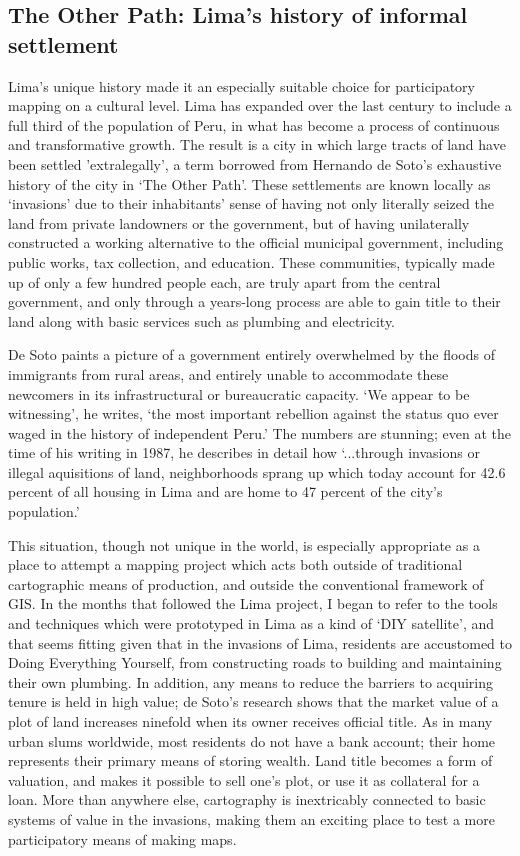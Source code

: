 \documentclass[11pt]{report}
\begin{document}
\subsection{The Other Path: Lima's history of informal settlement}

Lima's unique history made it an especially suitable choice for participatory mapping on a cultural level. Lima has expanded over the last century to include a full third of the population of Peru, in what has become a process of continuous and transformative growth. The result is a city in which large tracts of land have been settled 'extralegally', a term borrowed from Hernando de Soto's exhaustive history of the city in `The Other Path'. These settlements are known locally as `invasions' due to their inhabitants' sense of having not only literally seized the land from private landowners or the government, but of having unilaterally constructed a working alternative to the official municipal government, including public works, tax collection, and education. These communities, typically made up of only a few hundred people each, are truly apart from the central government, and only through a years-long process are able to gain title to their land along with basic services such as plumbing and electricity.

De Soto paints a picture of a government entirely overwhelmed by the floods of immigrants from rural areas, and entirely unable to accommodate these newcomers in its infrastructural or bureaucratic capacity. `We appear to be witnessing', he writes, `the most important rebellion against the status quo ever waged in the history of independent Peru.' The numbers are stunning; even at the time of his writing in 1987, he describes in detail how `...through invasions or illegal aquisitions of land, neighborhoods sprang up which today account for 42.6 percent of all housing in Lima and are home to 47 percent of the city's population.' \cite{desoto1987sendero}

This situation, though not unique in the world, is especially appropriate as a place to attempt a mapping project which acts both outside of traditional cartographic means of production, and outside the conventional framework of GIS. In the months that followed the Lima project, I began to refer to the tools and techniques which were prototyped in Lima as a kind of `DIY satellite', and that seems fitting given that in the invasions of Lima, residents are accustomed to Doing Everything Yourself, from constructing roads to building and maintaining their own plumbing. In addition, any means to reduce the barriers to acquiring tenure is held in high value; de Soto's research shows that the market value of a plot of land increases ninefold when its owner receives official title. As in many urban slums worldwide, most residents do not have a bank account; their home represents their primary means of storing wealth. Land title becomes a form of valuation, and makes it possible to sell one's plot, or use it as collateral for a loan. More than anywhere else, cartography is inextricably connected to basic systems of value in the invasions, making them an exciting place to test a more participatory means of making maps. 
\end{document}
